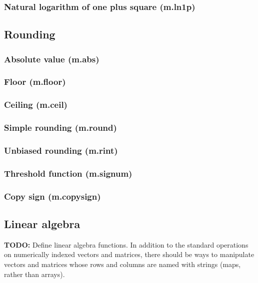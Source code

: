 \documentclass{article}
\theoremstyle{definition}
\begin{document}
\subsubsection{Natural logarithm of one plus square (m.ln1p)}

\subsection{Rounding}

\subsubsection{Absolute value (m.abs)}

\subsubsection{Floor (m.floor)}

\subsubsection{Ceiling (m.ceil)}

\subsubsection{Simple rounding (m.round)}

\subsubsection{Unbiased rounding (m.rint)}

\subsubsection{Threshold function (m.signum)}

\subsubsection{Copy sign (m.copysign)}

\subsection{Linear algebra}

{\bf TODO:} Define linear algebra functions.  In addition to the standard operations on numerically indexed vectors and matrices, there should be ways to manipulate vectors and matrices whose rows and columns are named with strings (maps, rather than arrays).
\end{document}
